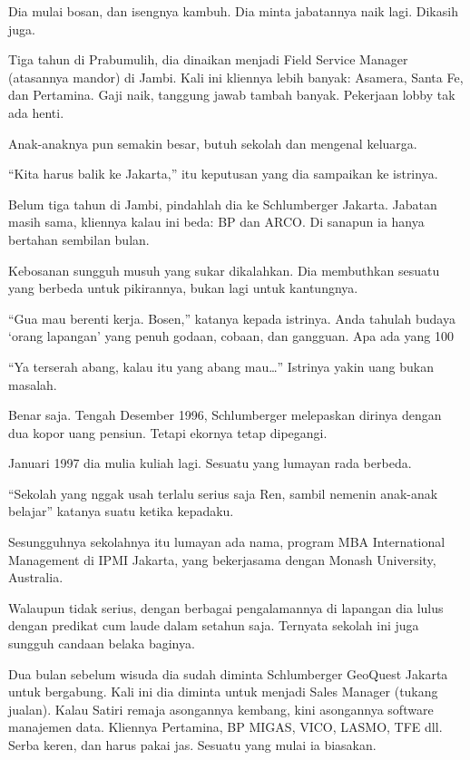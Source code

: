 Dia mulai bosan, dan isengnya kambuh. Dia minta jabatannya naik lagi. Dikasih juga.

Tiga tahun di Prabumulih, dia dinaikan menjadi Field Service Manager (atasannya mandor) di Jambi. Kali ini kliennya lebih banyak: Asamera, Santa Fe, dan Pertamina. Gaji naik, tanggung jawab tambah banyak. Pekerjaan lobby tak ada henti.

Anak-anaknya pun semakin besar, butuh sekolah dan mengenal keluarga.

“Kita harus balik ke Jakarta,” itu keputusan yang dia sampaikan ke istrinya.

Belum tiga tahun di Jambi, pindahlah dia ke Schlumberger Jakarta. Jabatan masih sama, kliennya kalau ini beda: BP dan ARCO. Di sanapun ia hanya bertahan sembilan bulan.

Kebosanan sungguh musuh yang sukar dikalahkan. Dia membuthkan sesuatu yang berbeda untuk pikirannya, bukan lagi untuk kantungnya.

“Gua mau berenti kerja. Bosen,” katanya kepada istrinya. Anda tahulah budaya ‘orang lapangan’ yang penuh godaan, cobaan, dan gangguan. Apa ada yang 100%

“Ya terserah abang, kalau itu yang abang mau…” Istrinya yakin uang bukan masalah.

Benar saja. Tengah Desember 1996, Schlumberger melepaskan dirinya dengan dua kopor uang pensiun. Tetapi ekornya tetap dipegangi.

Januari 1997 dia mulia kuliah lagi. Sesuatu yang lumayan rada berbeda.

“Sekolah yang nggak usah terlalu serius saja Ren, sambil nemenin anak-anak belajar” katanya suatu ketika kepadaku.

Sesungguhnya sekolahnya itu lumayan ada nama, program MBA International Management di IPMI Jakarta, yang bekerjasama dengan Monash University, Australia.

Walaupun tidak serius, dengan berbagai pengalamannya di lapangan dia lulus dengan predikat cum laude dalam setahun saja. Ternyata sekolah ini juga sungguh candaan belaka baginya.

Dua bulan sebelum wisuda dia sudah diminta Schlumberger GeoQuest Jakarta untuk bergabung. Kali ini dia diminta untuk menjadi Sales Manager (tukang jualan). Kalau Satiri remaja asongannya kembang, kini asongannya software manajemen data. Kliennya Pertamina, BP MIGAS, VICO, LASMO, TFE dll. Serba keren, dan harus pakai jas. Sesuatu yang mulai ia biasakan.

